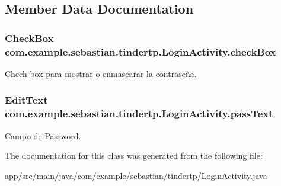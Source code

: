 \subsection{Member Data Documentation}
\subsubsection[{\texorpdfstring{check\+Box}{checkBox}}]{\setlength{\rightskip}{0pt plus 5cm}Check\+Box com.\+example.\+sebastian.\+tindertp.\+Login\+Activity.\+check\+Box\hspace{0.3cm}{\ttfamily [private]}}\hypertarget{classcom_1_1example_1_1sebastian_1_1tindertp_1_1LoginActivity_a429a1234958cee5c83b36522f16ae100}{}\label{classcom_1_1example_1_1sebastian_1_1tindertp_1_1LoginActivity_a429a1234958cee5c83b36522f16ae100}
Chech box para mostrar o enmascarar la contraseña. 
\subsubsection[{\texorpdfstring{pass\+Text}{passText}}]{\setlength{\rightskip}{0pt plus 5cm}Edit\+Text com.\+example.\+sebastian.\+tindertp.\+Login\+Activity.\+pass\+Text\hspace{0.3cm}{\ttfamily [private]}}\hypertarget{classcom_1_1example_1_1sebastian_1_1tindertp_1_1LoginActivity_a8590bdba6d094c75f8dd360c5a78c928}{}\label{classcom_1_1example_1_1sebastian_1_1tindertp_1_1LoginActivity_a8590bdba6d094c75f8dd360c5a78c928}
Campo de Password. 

The documentation for this class was generated from the following file\+:\begin{DoxyCompactItemize}
\item 
app/src/main/java/com/example/sebastian/tindertp/Login\+Activity.\+java\end{DoxyCompactItemize}
